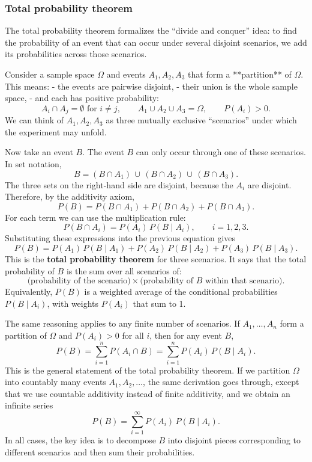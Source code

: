 \newpage
\subsubsection{Total probability theorem}

The total probability theorem formalizes the “divide and conquer” idea: to find the probability of an event that can occur under several disjoint scenarios, we add its probabilities across those scenarios.

Consider a sample space \(\Omega\) and events \(A_1, A_2, A_3\) that form a **partition** of \(\Omega\). This means:
- the events are pairwise disjoint,
- their union is the whole sample space,
- and each has positive probability:
\[
A_i \cap A_j = \emptyset \text{ for } i \neq j, 
\qquad
A_1 \cup A_2 \cup A_3 = \Omega,
\qquad
P(A_i) > 0.
\]
We can think of \(A_1, A_2, A_3\) as three mutually exclusive “scenarios” under which the experiment may unfold.

Now take an event \(B\). The event \(B\) can only occur through one of these scenarios. In set notation,
\[
B = (B \cap A_1) \,\cup\, (B \cap A_2) \,\cup\, (B \cap A_3).
\]
The three sets on the right-hand side are disjoint, because the \(A_i\) are disjoint. Therefore, by the additivity axiom,
\[
P(B) = P(B \cap A_1) + P(B \cap A_2) + P(B \cap A_3).
\]
For each term we can use the multiplication rule:
\[
P(B \cap A_i) = P(A_i)\,P(B \mid A_i), \qquad i = 1,2,3.
\]
Substituting these expressions into the previous equation gives
\[
P(B) = P(A_1)\,P(B \mid A_1)
      + P(A_2)\,P(B \mid A_2)
      + P(A_3)\,P(B \mid A_3).
\]
This is the \textbf{total probability theorem} for three scenarios. It says that the total probability of \(B\) is the sum over all scenarios of:
\[
\text{(probability of the scenario)} \times \text{(probability of \(B\) within that scenario)}.
\]
Equivalently, \(P(B)\) is a weighted average of the conditional probabilities \(P(B \mid A_i)\), with weights \(P(A_i)\) that sum to 1.

The same reasoning applies to any finite number of scenarios. If \(A_1, \dots, A_n\) form a partition of \(\Omega\) and \(P(A_i) > 0\) for all \(i\), then for any event \(B\),
\[
P(B) = \sum_{i=1}^n P(A_i \cap B)
     = \sum_{i=1}^n P(A_i)\,P(B \mid A_i).
\]
This is the general statement of the total probability theorem. If we partition \(\Omega\) into countably many events \(A_1, A_2, \dots\), the same derivation goes through, except that we use countable additivity instead of finite additivity, and we obtain an infinite series
\[
P(B) = \sum_{i=1}^\infty P(A_i)\,P(B \mid A_i).
\]
In all cases, the key idea is to decompose \(B\) into disjoint pieces corresponding to different scenarios and then sum their probabilities.

